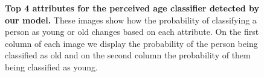 \begin{figure}[H]
    \centering
        \hspace{0.15em}
        \hspace{0.15em}
        \hspace{0.15em}
        \caption {\textbf{Top 4 attributes for the perceived age classifier detected by our model.} These images show how the probability of classifying a person as young or old changes based on each attribute. On the first column of each image we display the probability of the person being classified as old and on the second column the probability of them being classified as young.} 
        \label{fig:top 4 attrs ours}
    \end{figure}
    


